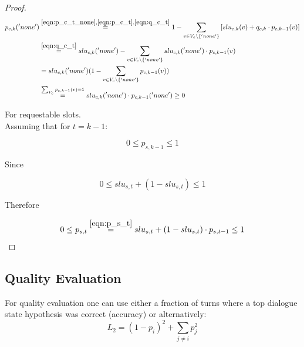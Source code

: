 \documentclass[12pt,titlepage,a4paper]{article}
\begin{document}
\begin{proof}
    \begin{equation}
        \begin{aligned}
            p_{c,k}('none') 
            &\overset{
                \mathrm{\ref{eqn:p_c_t_none}},
                \mathrm{\ref{eqn:p_c_t}}, 
                \mathrm{\ref{eqn:q_c_t}}
                }{=} 1 - \sum_{v \in V_{c} \backslash \{'none'\}} \left[ slu_{c,k}(v) + q_{c,k} \cdot p_{c,k-1}(v) \right] \\ 
            &\overset{
                \mathrm{\ref{eqn:q_c_t}}
                }{=} slu_{c,k}('none') - \sum_{v \in V_{c} \backslash \{'none'\}} slu_{c,k}('none') \cdot p_{c,k-1}(v) \\ 
            &= slu_{c,k}('none')(1 - \sum_{v \in V_{c} \backslash \{'none'\}}p_{c, k-1}(v)) 
            \\
            &\overset{\sum_{V_c}p_{c, k-1}(v) = 1}{=} slu_{c,k}('none') \cdot p_{c, k-1}('none') \geq 0
        \end{aligned}
    \end{equation}

    For requestable slots. \\
    
    Assuming that for $t = k-1$:

    \begin{equation}
        0 \leq p_{s,k-1} \leq 1
    \end{equation}
    
    \noindent Since
    
    \begin{equation}
        0 \leq slu_{s,t} + (1 - slu_{s,t}) \leq 1
    \end{equation}

    \noindent Therefore

    \begin{equation}
        0 \leq p_{s,t} \overset{\ref{eqn:p_s_t}}{=} slu_{s,t} + (1 - slu_{s,t}) \cdot p_{s,t-1} \leq 1
    \end{equation}
\end{proof}

\subsection{Quality Evaluation}
For quality evaluation one can use either a fraction of turns where a top dialogue state hypothesis was correct (accuracy) or alternatively:
\begin{equation}
    L_2 = (1-p_i)^2 + \sum_{j \neq i} p_j^2
    \label{l2}
\end{equation}
\end{document}
